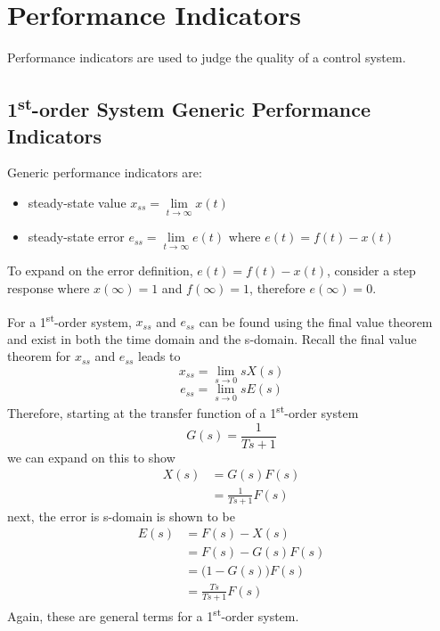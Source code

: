 \documentclass[12pt,letter]{article}
\begin{document}
%	
%	

	\setcounter{section}{5}	
	\setcounter{figure}{0}   
	\renewcommand\thefigure{\thesection.\arabic{figure}}


\section{Performance Indicators}

Performance indicators are used to judge the quality of a control system. 

\subsection{1\textsuperscript{st}-order System Generic Performance Indicators}


Generic performance indicators are:
\begin{itemize}
	\item steady-state value $x_{ss} = \lim\limits_{t \rightarrow \infty} x(t)$
	\item steady-state error $e_{ss} = \lim\limits_{t \rightarrow \infty} e(t)$ where  $e(t) = f(t) - x(t)$
\end{itemize}
To expand on the error definition, $e(t) = f(t) - x(t)$, consider a step response where $x(\infty) =1$ and $f(\infty) =1$, therefore $e(\infty)=0$. 

For a 1\textsuperscript{st}-order system, $x_{ss}$ and $e_{ss}$ can be found using the final value theorem and exist in both the time domain and the s-domain. Recall the final value theorem for  $x_{ss}$ and $e_{ss}$ leads to
\begin{equation}
x_{ss} = \lim\limits_{s \rightarrow 0} s X(s)
\end{equation}
\begin{equation}
e_{ss} = \lim\limits_{s \rightarrow 0} s E(s)
\end{equation}
Therefore, starting at the transfer function of a 1\textsuperscript{st}-order system
\begin{equation}
G(s) = \frac{1}{Ts+1}
\end{equation}
we can expand on this to show
\begin{align}
X(s) &= G(s)F(s) \\
&= \frac{1}{Ts +1}F(s) \nonumber
\end{align}
next, the error is s-domain is shown to be
\begin{align}
E(s) &= F(s) - X(s) \\
&= F(s) - G(s)F(s) \\ \nonumber
&= \big( 1-G(s) \big) F(s) \\ \nonumber
&= \frac{Ts}{Ts +1} F(s) \nonumber
\end{align}
Again, these are general terms for a 1\textsuperscript{st}-order system. 
\end{document}
